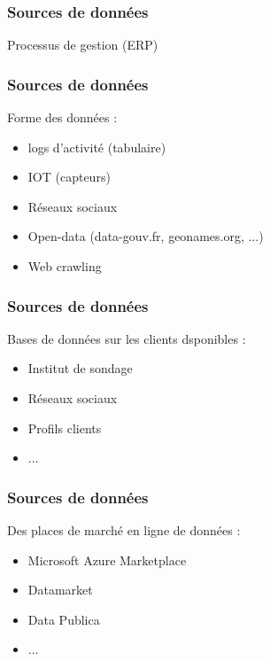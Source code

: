 \begin{frame}
  \frametitle{Sources de données}
  Processus de gestion (ERP)
\end{frame}

\begin{frame}
  \frametitle{Sources de données}
  Forme des données :
  \begin{itemize}
  \item logs d'activité (tabulaire)
  \item IOT (capteurs)
  \item Réseaux sociaux
  \item Open-data (data-gouv.fr, geonames.org, ...)
  \item Web crawling 
  \end{itemize}

\end{frame}

\begin{frame}
  \frametitle{Sources de données}
  Bases de données sur les clients dsponibles :
  \begin{itemize}
  \item Institut de sondage
  \item Réseaux sociaux
  \item Profils clients
  \item ...
  \end{itemize}
\end{frame}
    
\begin{frame}
  \frametitle{Sources de données}
  Des places de marché en ligne de données :
  \begin{itemize}
  \item Microsoft Azure Marketplace
  \item Datamarket
  \item Data Publica
  \item ...
  \end{itemize}
\end{frame}

